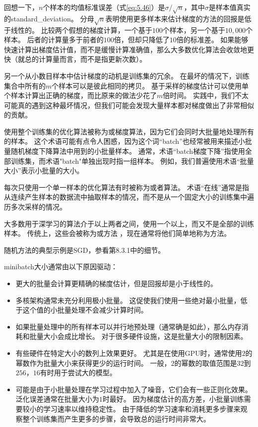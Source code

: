 回想一下，$n$个样本的均值标准误差（式\ref{eq:5.46}）是$\sigma/\sqrt{n}$，其中$\sigma$是样本值真实的\gls{standard_deviation}。
分母$\sqrt{n}$表明使用更多样本来估计梯度的方法的回报是低于线性的。
比较两个假想的梯度计算，一个基于$100$个样本，另一个基于$10,000$个样本。
后者的计算量多于前者的$100$倍，但却只降低了$10$倍的标准差。
如果能够快速计算出梯度估计值，而不是缓慢计算准确值，那么大多数优化算法会收敛地更快（就总的计算量而言，而不是指更新次数）。

另一个从小数目样本中估计梯度的动机是训练集的冗余。
在最坏的情况下，训练集合中所有的$m$个样本可以是彼此相同的拷贝。
基于采样的梯度估计可以使用单个样本计算出正确的梯度，而比原来的做法少花了$m$倍时间。
实践中，我们不太可能真的遇到这种最坏情况，但我们可能会发现大量样本都对梯度做出了非常相似的贡献。

使用整个训练集的优化算法被称为或梯度算法，因为它们会同时大批量地处理所有的样本。
这个术语可能有点令人困惑，因为这个词“\gls{batch}”也经常被用来描述小批量随机梯度下降算法中用到的小批量样本。
通常，术语“\gls{batch}梯度下降”指使用全部训练集，而术语"\gls{batch}"单独出现时指一组样本。
例如，我们普遍使用术语“批量大小”表示小批量的大小。

每次只使用一个单一样本的优化算法有时被称为或者算法。
术语“在线”通常是指从连续产生样本的数据流中抽取样本的情况，而不是从一个固定大小的训练集中遍历多次采样的情况。


大多数用于深学习的算法介于以上两者之间，使用一个以上，而又不是全部的训练样本。
传统上，这些会被称为或方法 ，现在通常将他们简单地称为方法。

随机方法的典型示例是\gls{SGD}，参看第8.3.1中的细节。

\gls{minibatch}大小通常由以下原因驱动：
\begin{itemize}
    \item 更大的批量会计算更精确的梯度估计，但是回报却是小于线性的。
    
    \item 多核架构通常未充分利用极小批量。
    这促使我们使用一些绝对最小批量，低于这个值的小批量处理不会减少计算时间。
    
    \item 如果批量处理中的所有样本可以并行地预处理（通常确是如此），那么内存消耗和批量大小会成比增长。
    对于很多硬件设施，这是批量大小的限制因素。
    
    \item 有些硬件在特定大小的数列上效果更好。
    尤其是在使用GPU时，通常使用$2$的幂数作为批量大小来获得更少的运行时间。
    一般，$2$的幂数的取值范围是$32$到$256$，$16$有时用于尝试大的模型。
    
    \item 
    可能是由于小批量处理在学习过程中加入了噪音，它们会有一些正则化效果\citep{Wilson-2003}。
    泛化误差通常在批量大小为$1$时最好。
    因为梯度估计的高方差，小批量训练需要较小的学习速率以维持稳定性。
    由于降低的学习速率和消耗更多步骤来观察整个训练集而产生更多的步骤，会导致总的运行时间非常大。
\end{itemize}

